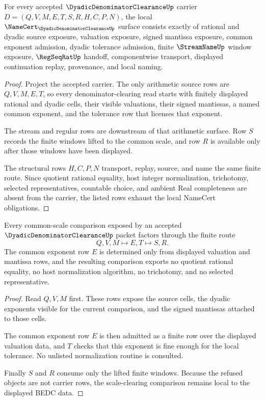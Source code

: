 \begin{theorem}
\label{thm:dyadic-denominator-clearance-namecert-obligations}
For every accepted $\DyadicDenominatorClearanceUp$ carrier $D=(Q,V,M,E,T,S,R,H,C,P,N)$, the local $\NameCert_{\DyadicDenominatorClearanceUp}$ surface consists exactly of rational and dyadic source exposure, valuation exposure, signed mantissa exposure, common exponent admission, dyadic tolerance admission, finite $\StreamNameUp$ window exposure, $\RegSeqRatUp$ handoff, componentwise transport, displayed continuation replay, provenance, and local naming.
\end{theorem}
\begin{proof}
Project the accepted carrier. The only arithmetic source rows are $Q,V,M,E,T$, so every denominator-clearing read starts with finitely displayed rational and dyadic cells, their visible valuations, their signed mantissas, a named common exponent, and the tolerance row that licenses that exponent.

The stream and regular rows are downstream of that arithmetic surface. Row $S$ records the finite windows lifted to the common scale, and row $R$ is available only after those windows have been displayed.

The structural rows $H,C,P,N$ transport, replay, source, and name the same finite route. Since quotient rational equality, host integer normalization, trichotomy, selected representatives, countable choice, and ambient Real completeness are absent from the carrier, the listed rows exhaust the local NameCert obligations.
\end{proof}

\begin{theorem}
\label{thm:dyadic-denominator-clearance-scale-clearing}
Every common-scale comparison exposed by an accepted $\DyadicDenominatorClearanceUp$ packet factors through the finite route
$$
Q,V,M
\longmapsto
E,T
\longmapsto
S,R .
$$
The common exponent row $E$ is determined only from displayed valuation and mantissa rows, and the resulting comparison exports no quotient rational equality, no host normalization algorithm, no trichotomy, and no selected representative.
\end{theorem}
\begin{proof}
Read $Q,V,M$ first. These rows expose the source cells, the dyadic exponents visible for the current comparison, and the signed mantissas attached to those cells.

The common exponent row $E$ is then admitted as a finite row over the displayed valuation data, and $T$ checks that this exponent is fine enough for the local tolerance. No unlisted normalization routine is consulted.

Finally $S$ and $R$ consume only the lifted finite windows. Because the refused objects are not carrier rows, the scale-clearing comparison remains local to the displayed BEDC data.
\end{proof}

